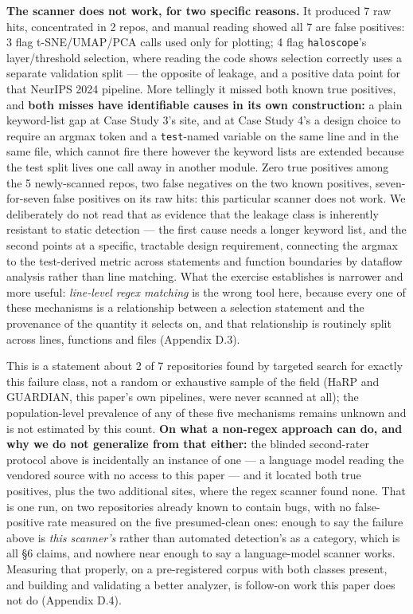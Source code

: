 \documentclass[10pt]{article} %
\begin{document}
\textbf{The scanner does not work, for two specific reasons.} It produced 7 raw
hits, concentrated in 2 repos, and manual reading showed all 7 are false
positives: 3 flag t-SNE/UMAP/PCA calls used only for plotting; 4 flag
\texttt{haloscope}'s layer/threshold selection, where reading the code shows
selection correctly uses a separate validation split --- the opposite of
leakage, and a positive data point for that NeurIPS 2024 pipeline. More
tellingly it missed both known true positives, and \textbf{both misses have
identifiable causes in its own construction:} a plain keyword-list gap at Case
Study 3's site, and at Case Study 4's a design choice to require an argmax
token and a \texttt{test}-named variable on the same line and in the same file,
which cannot fire there however the keyword lists are extended because the test
split lives one call away in another module. Zero true positives among the 5
newly-scanned repos, two false negatives on the two known positives,
seven-for-seven false positives on its raw hits: this particular scanner does
not work. We deliberately do not read that as evidence that the leakage class
is inherently resistant to static detection --- the first cause needs a longer
keyword list, and the second points at a specific, tractable design
requirement, connecting the argmax to the test-derived metric across statements
and function boundaries by dataflow analysis rather than line matching. What
the exercise establishes is narrower and more useful: \emph{line-level regex
matching} is the wrong tool here, because every one of these mechanisms is a
relationship between a selection statement and the provenance of the quantity
it selects on, and that relationship is routinely split across lines, functions
and files (Appendix D.3).

This is a statement about 2 of 7 repositories found by targeted search for
exactly this failure class, not a random or exhaustive sample of the field
(HaRP and GUARDIAN, this paper's own pipelines, were never scanned at all); the
population-level prevalence of any of these five mechanisms remains unknown and
is not estimated by this count. \textbf{On what a non-regex approach can do, and
why we do not generalize from that either:} the blinded second-rater protocol
above is incidentally an instance of one --- a language model reading the
vendored source with no access to this paper --- and it located both true
positives, plus the two additional sites, where the regex scanner found none.
That is one run, on two repositories already known to contain bugs, with no
false-positive rate measured on the five presumed-clean ones: enough to say the
failure above is \emph{this scanner's} rather than automated detection's as a
category, which is all §6 claims, and nowhere near enough to say a
language-model scanner works. Measuring that properly, on a pre-registered
corpus with both classes present, and building and validating a better
analyzer, is follow-on work this paper does not do (Appendix D.4).
\end{document}

